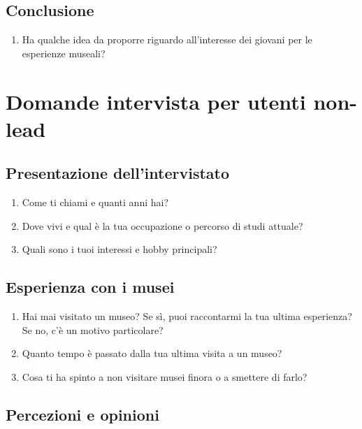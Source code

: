 \documentclass[a4paper, 12pt]{article}
\begin{document}
\subsection{\textcolor{subsectioncolor}{Conclusione}}

\begin{enumerate}
    \item Ha qualche idea da proporre riguardo all'interesse dei giovani per le esperienze museali?
\end{enumerate}

\newpage

\section{\textcolor{sectioncolor}{Domande intervista per utenti non-lead}}
\subsection{\textcolor{subsectioncolor}{Presentazione dell'intervistato}}

\begin{enumerate}
    \item Come ti chiami e quanti anni hai?
    \item Dove vivi e qual è la tua occupazione o percorso di studi attuale?
    \item Quali sono i tuoi interessi e hobby principali?
\end{enumerate}

\subsection{\textcolor{subsectioncolor}{Esperienza con i musei}}

\begin{enumerate}
    \item Hai mai visitato un museo? Se sì, puoi raccontarmi la tua ultima esperienza? Se no, c'è un motivo particolare?
    \item Quanto tempo è passato dalla tua ultima visita a un museo?
    \item Cosa ti ha spinto a non visitare musei finora o a smettere di farlo?
\end{enumerate}

\subsection{\textcolor{subsectioncolor}{Percezioni e opinioni}}
\end{document}
